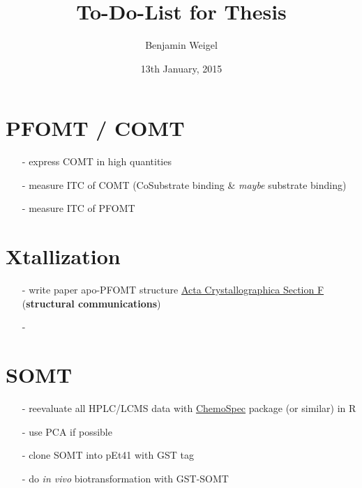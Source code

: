 \documentclass[10pt]{scrartcl}\usepackage[]{graphicx}\usepackage[]{color}
\author{Benjamin Weigel}
\title{To-Do-List for Thesis}
\date{13th January, 2015}
\begin{document}
\sffamily
\maketitle

\section{PFOMT / COMT}
\begin{itemize}
\item[-]express COMT in high quantities
\item[-]measure ITC of COMT (CoSubstrate binding \& \emph{maybe} substrate binding)
\vspace{0.5cm}
\item[-]measure ITC of PFOMT
\end{itemize}

\section{Xtallization}
\begin{itemize}
\item[-]write paper apo-PFOMT structure \href{http://onlinelibrary.wiley.com/journal/10.1111/%28ISSN%292053-230X}{Acta Crystallographica Section F} (\textbf{structural communications})
\item[-]
\end{itemize}

\section{SOMT}
\begin{itemize}
\item[-]reevaluate all HPLC/LCMS data with \href{http://cran.r-project.org/web/packages/ChemoSpec/index.html}{\ttfamily ChemoSpec} package (or similar) in R
\item[-]use PCA if possible 
\vspace{0.5cm}
\item[-]clone SOMT into pEt41 with GST tag
\item[-]do \textit{in vivo} biotransformation with GST-SOMT
\end{itemize}
\end{document}
